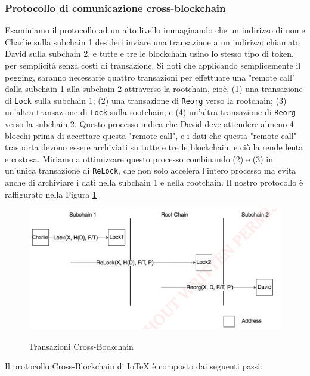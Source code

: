 \documentclass[a4paper,12pt]{article}
\begin{document}
\subsubsection{Protocollo di comunicazione cross-blockchain}
Esaminiamo il protocollo ad un alto livello immaginando che un indirizzo di nome Charlie sulla
subchain 1 desideri inviare una transazione a un indirizzo chiamato David sulla subchain 2, e tutte e tre le blockchain usino lo stesso tipo di token, per semplicità senza costi di transazione. Si noti che applicando semplicemente il pegging, saranno necessarie quattro transazioni per effettuare una "remote call" dalla subchain 1 alla subchain 2 attraverso la rootchain, cioè, (1) una transazione di \texttt{Lock} sulla subchain 1; (2) una transazione di \texttt{Reorg} verso la rootchain; (3) un'altra transazione di \texttt{Lock} sulla rootchain; e (4) un'altra transazione di \texttt{Reorg} verso la subchain 2.
Questo processo indica che David deve attendere almeno 4 blocchi prima di accettare questa "remote call", e i dati che questa "remote call" trasporta devono essere archiviati su tutte e tre le blockchain, e ciò la rende lenta e costosa. Miriamo a ottimizzare questo processo combinando (2)
e (3) in un'unica transazione di \texttt{ReLock}, che non solo accelera l'intero processo ma
evita anche di archiviare i dati nella subchain 1 e nella rootchain. Il nostro protocollo è raffigurato
nella Figura \ref{fig:fig2}

\begin{figure}[ht]
	\includegraphics[width=\textwidth]{Figura2.png}
	\label{fig:fig2}
	\caption{Transazioni Cross-Bockchain}
\end{figure}

Il protocollo Cross-Blockchain di IoTeX è composto dai seguenti passi:
\end{document}
